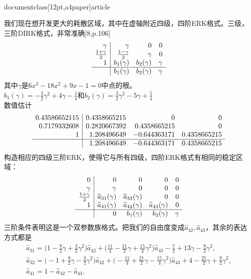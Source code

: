 \\documentclass[12pt,a4paper]{article}
\begin{document}
我们现在想开发更大的耗散区域，其中在虚轴附近四级，四阶ERK格式。三级，三阶DIRK格式，非常准确[8,p.106]
\[
\begin{array}{r|rrr}
\gamma & \gamma & 0 & 0\\
\frac{1+\gamma }{2} & \frac{1-\gamma }{2} & \gamma  & 0 \\
1 & b_{1}(\gamma ) &  b_{2}(\gamma ) & \gamma \\
\hline
&  b_{1}(\gamma ) &  b_{2}(\gamma ) &\gamma
\end{array}
\]
其中$\gamma$是$6x^3-18x^2+9x-1=0$中点的根。\\
$b_{1}(\gamma)=-\frac{3}{2}\gamma^2+4\gamma-\frac{1}{4}$和$b_{2}(\gamma)=\frac{3}{2}\gamma^2-5\gamma+\frac{5}{4}$\\
数值估计
\[
\begin{array}{r|rrr}
0.43586652115 & 0.4358665215 & 0 & 0\\
0.7179332608 &0.2820667392 & 0.4358665215 & 0\\
1 & 1.208496649 & -0.644363171 & 0.4358665215 \\
\hline
& 1.208496649 & -0.644363171 & 0.4358665215
\end{array}
\]
构造相应的四级三阶ERK，使得它与所有四级，四阶ERK格式有相同的稳定区域：
\[
\begin{array}{r|rrrr}
0 & 0 & 0 & 0 & 0 \\
\gamma & \gamma & 0 & 0 & 0\\
\frac{1+\gamma}{2} & \widehat{a}_{31}(\gamma) & \widehat{a}_{32}(\gamma) & 0 & 0\\
1 & \widehat{a}_{41}(\gamma) & \widehat{a}_{42}(\gamma) & \widehat{a}_{43}(\gamma) & 0\\
\hline
& 0 & b_{1}(\gamma) & b_{2}(\gamma) & \gamma 
\end{array}
\]
三阶条件表明这是一个双参数族格式。把我们的自由度变成$\widehat{a}_{42},\widehat{a}_{43}$，其余的表达方式都是
\begin{gather}
\widehat{a}_{31}=\bigg(1-\frac{9}{2}\gamma+\frac{3}{2}\gamma^2\biggl)\widehat{a}_{42}+\bigg(\frac{11}{4}-\frac{21}{2}\gamma+\frac{15}{4}\gamma^2\biggl)\widehat{a}_{43}-\frac{7}{2}+13\gamma-\frac{9}{2}\gamma^2,\\
\widehat{a}_{32}=\bigg (-1+\frac{9}{2}\gamma-\frac{3}{2}\gamma^2\biggl)\widehat{a}_{42}+\bigg(-\frac{11}{4}+\frac{21}{2}\gamma-\frac{15}{4}\gamma^2\biggl)\widehat{a}_{43}+4-\frac{25}{2}\gamma+\frac{9}{2}\gamma^2,\\
\widehat{a}_{41}=1-\widehat{a}_{42}-\widehat{a}_{43}.
\end{gather}
\end{document}
